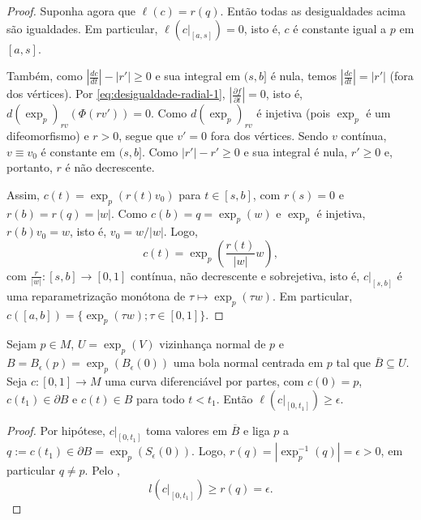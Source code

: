 \begin{lemma}
\begin{proof}
        Suponha agora que $\ell(c)=r(q)$. Então todas as desigualdades acima são igualdades. Em particular, $\ell(c|_{[a,s]})=0$, isto é, $c$ é constante igual a $p$ em $[a,s]$.

        Também, como $\left\lvert \frac{dc}{dt} \right\rvert-|r'|\geq0$ e sua integral em $(s,b]$ é nula, temos $\left\lvert \frac{dc}{dt} \right\rvert=|r'|$ (fora dos vértices). Por \eqref{eq:desigualdade-radial-1}, $\left\lvert \frac{\partial f}{\partial t} \right\rvert=0$, isto é, $d(\exp_{p})_{rv}(\Phi(rv'))=0$. Como $d(\exp_{p})_{rv}$ é injetiva (pois $\exp_{p}$ é um difeomorfismo) e $r>0$, segue que $v'=0$ fora dos vértices. Sendo $v$ contínua, $v\equiv v_{0}$ é constante em $(s,b]$. Como $|r'|-r'\geq0$ e sua integral é nula, $r'\geq0$ e, portanto, $r$ é não decrescente.

        Assim, $c(t)=\exp_{p}(r(t)v_{0})$ para $t\in[s,b]$, com $r(s)=0$ e $r(b)=r(q)=|w|$. Como $c(b)=q=\exp_{p}(w)$ e $\exp_{p}$ é injetiva, $r(b)v_{0}=w$, isto é, $v_{0}=w/|w|$. Logo,
        \begin{equation*}
            c(t)=\exp_{p}\left(\frac{r(t)}{|w|}w\right),
        \end{equation*}
        com $\frac{r}{|w|}:[s,b]\to[0,1]$ contínua, não decrescente e sobrejetiva, isto é, $c|_{[s,b]}$ é uma reparametrização monótona de $\tau\mapsto\exp_{p}(\tau w)$. Em particular, $c([a,b])=\{ \exp_{p}(\tau w);\tau\in[0,1] \}$.
    \end{proof}
\end{lemma}
\begin{lemma}
    \label{lem:comprimento-fronteira-bola-normal}
    Sejam $p \in M$, $U=\exp_{p}(V)$ vizinhança normal de $p$ e $B=B_{\epsilon}(p)=\exp_{p}(B_{\epsilon}(0))$ uma bola normal centrada em $p$ tal que $\overline{B}\subseteq U$. Seja $c:[0,1]\to M$ uma curva diferenciável por partes, com $c(0)=p$, $c(t_{1})\in\partial B$ e $c(t)\in B$ para todo $t<t_{1}$. Então $\ell(c|_{[0,t_{1}]})\geq\epsilon$.
    \begin{proof}

        Por hipótese, $c|_{[0,t_{1}]}$ toma valores em $\overline{B}$ e liga $p$ a $q:=c(t_{1})\in\partial B=\exp_{p}(S_{\epsilon}(0))$. Logo, $r(q)=|\exp_{p}^{-1}(q)|=\epsilon>0$, em particular $q\neq p$. Pelo ,
        \begin{equation*}
            l(c|_{[0,t_{1}]})\geq r(q)=\epsilon.
        \end{equation*}
    \end{proof}
\end{lemma}
